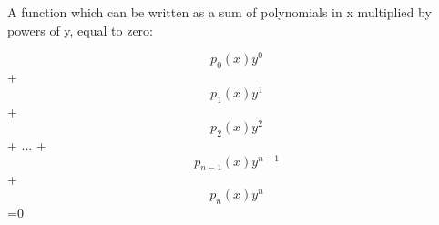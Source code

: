 A function which can be written as a sum of polynomials in x
multiplied by powers of y, equal to zero:
\par $$p_{0}(x)y^{0}$$  
+ $$p_{1}(x)y^{1}$$  
+ $$p_{2}(x)y^{2}$$  
+ ...
+ $$p_{n-1}(x)y^{n-1}$$  
+ $$p_{n}(x)y^{n}$$  
=0